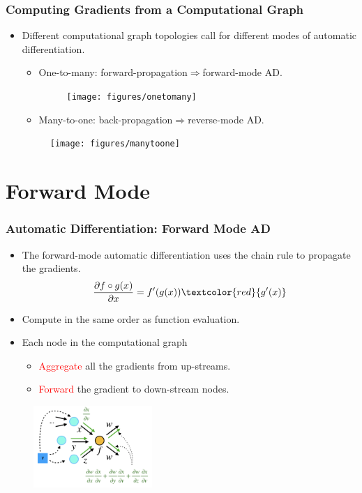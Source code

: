 \documentclass{beamer}
\newcommand{\red}[1]{\textcolor{red}{#1}}
\begin{document}
\begin{frame}
\frametitle{Computing Gradients from a Computational Graph}
	\begin{itemize}
	\item Different computational graph topologies call for different modes of automatic differentiation. 
		\begin{itemize}
		\item One-to-many: forward-propagation$\Rightarrow$forward-mode AD. 
		\begin{figure}[hbt]
  \texttt{[image: figures/onetomany]}
\end{figure}
		\item Many-to-one: back-propagation$\Rightarrow$reverse-mode AD.
			\end{itemize}
	\begin{figure}[hbt]
  \texttt{[image: figures/manytoone]}
\end{figure}
  \end{itemize} 

\end{frame}



\section{Forward Mode}



\begin{frame}
	\frametitle{Automatic Differentiation: Forward Mode AD}

	\begin{itemize}
	\item The forward-mode automatic differentiation uses the chain rule to propagate the gradients. 
	$$\frac{\partial f\circ g (x)}{\partial x} =  f'(g(x)) \red{ g'(x)}$$
		\item Compute in the same order as function evaluation. 
		\item Each node in the computational graph
		\begin{itemize}
		\item \red{Aggregate} all the gradients from up-streams. 
		\item \red{Forward} the gradient to down-stream nodes.  
		\end{itemize} 
	\end{itemize}
	
	\begin{figure}[hbt]
  \includegraphics[width=0.4\textwidth]{../fad}
\end{figure}
	
	
\end{frame}
\end{document}
